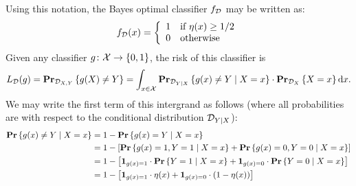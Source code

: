 Using this notation, the Bayes optimal classifier $f_{\mathcal{D}}$ may be written as:
\[
    f_{\mathcal{D}} (x) = \left \{ \begin{array}{ll}
                                1 & \text{if } \eta(x) \geq 1/2 \\
                                0 & \text{otherwise}
                         \end{array} \right .
\]
Given any classifier $g \colon \mathcal{X} \rightarrow \{0, 1\}$, the risk of this
classifier is
\begin{equation}
\label{ex3.7:loss}
    L_{\mathcal{D}} (g) = \mathbf{Pr}_{\mathcal{D}_{X, Y}} \left \{ g(X) \neq Y \right \} = \int_{x \in \mathcal{X}}
 \mathbf{Pr}_{\mathcal{D}_{Y \mid X}} \left \{ g(x) \neq Y \mid X = x \right \} \cdot \mathbf{Pr}_{\mathcal{D}_{X}} \left \{ X = x \right \} \text{d} x.
\end{equation}
We may write the first term of this intergrand as follows (where all probabilities
are with respect to the conditional distribution $\mathcal{D}_{Y \mid X}$):
\begin{align*}
    \mathbf{Pr} \left \{ g(x) \neq Y \mid X = x \right \} & =  1 - \mathbf{Pr} \left \{ g(x) = Y \mid X = x \right \} \\
    & = 1 - \left [ \mathbf{Pr} \left \{ g(x) = 1, Y = 1 \mid X = x \right \} + \mathbf{Pr} \left \{ g(x) = 0, Y = 0 \mid X = x \right \} \right ] \\
    & = 1 - \left [ \mathbf{1}_{g(x) = 1} \cdot \mathbf{Pr} \left \{ Y = 1 \mid X = x \right \}  +
                  \mathbf{1}_{g(x) = 0} \cdot \mathbf{Pr} \left \{ Y = 0 \mid X = x \right \} \right ] \\
    & = 1 - \left [ \mathbf{1}_{g(x) = 1} \cdot \eta (x)  +
                  \mathbf{1}_{g(x) = 0} \cdot (1 - \eta (x)) \right ] \\
\end{align*}

